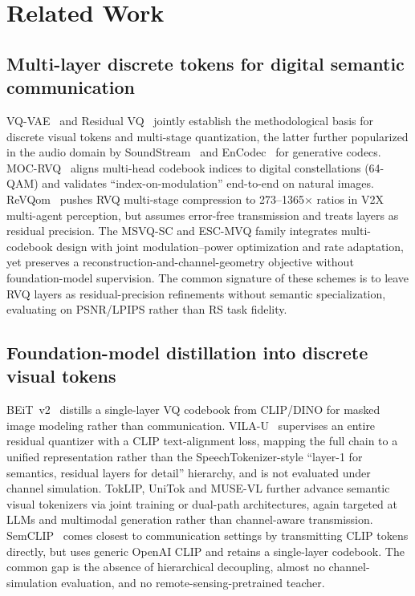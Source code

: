 \documentclass[lettersize,journal]{IEEEtran}
\begin{document}
\section{Related Work}

\subsection{Multi-layer discrete tokens for digital semantic communication}
VQ-VAE~\cite{vqvae} and Residual VQ~\cite{lee2022residual} jointly establish the methodological basis for discrete visual tokens and multi-stage quantization, the latter further popularized in the audio domain by SoundStream~\cite{soundstream} and EnCodec~\cite{encodec} for generative codecs. MOC-RVQ~\cite{moc-rvq} aligns multi-head codebook indices to digital constellations (64-QAM) and validates ``index-on-modulation'' end-to-end on natural images. ReVQom~\cite{revqom} pushes RVQ multi-stage compression to 273--1365$\times$ ratios in V2X multi-agent perception, but assumes error-free transmission and treats layers as residual precision. The MSVQ-SC and ESC-MVQ family integrates multi-codebook design with joint modulation--power optimization and rate adaptation, yet preserves a reconstruction-and-channel-geometry objective without foundation-model supervision. The common signature of these schemes is to leave RVQ layers as residual-precision refinements without semantic specialization, evaluating on PSNR/LPIPS rather than RS task fidelity.

\subsection{Foundation-model distillation into discrete visual tokens}
BEiT~v2~\cite{beitv2} distills a single-layer VQ codebook from CLIP/DINO for masked image modeling rather than communication. VILA-U~\cite{vilau} supervises an entire residual quantizer with a CLIP text-alignment loss, mapping the full chain to a unified representation rather than the SpeechTokenizer-style ``layer-1 for semantics, residual layers for detail'' hierarchy, and is not evaluated under channel simulation. TokLIP, UniTok and MUSE-VL further advance semantic visual tokenizers via joint training or dual-path architectures, again targeted at LLMs and multimodal generation rather than channel-aware transmission. SemCLIP~\cite{semclip} comes closest to communication settings by transmitting CLIP tokens directly, but uses generic OpenAI CLIP and retains a single-layer codebook. The common gap is the absence of hierarchical decoupling, almost no channel-simulation evaluation, and no remote-sensing-pretrained teacher.
\end{document}
